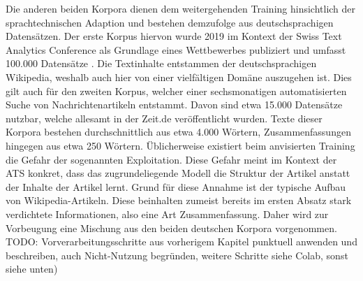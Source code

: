 Die anderen beiden Korpora dienen dem weitergehenden Training hinsichtlich der sprachtechnischen Adaption und bestehen demzufolge aus deutschsprachigen Datensätzen. Der erste Korpus hiervon wurde 2019 im Kontext der Swiss Text Analytics Conference als Grundlage eines Wettbewerbes publiziert und umfasst 100.000 Datensätze \cite{CIE19}. Die Textinhalte entstammen der deutschsprachigen Wikipedia, weshalb auch hier von einer vielfältigen Domäne auszugehen ist. Dies gilt auch für den zweiten Korpus, welcher einer sechsmonatigen automatisierten Suche von Nachrichtenartikeln entstammt. Davon sind etwa 15.000 Datensätze nutzbar, welche allesamt in der Zeit.de veröffentlicht wurden. Texte dieser Korpora bestehen durchschnittlich aus etwa 4.000 Wörtern, Zusammenfassungen hingegen aus etwa 250 Wörtern. Üblicherweise existiert beim anvisierten Training die Gefahr der sogenannten Exploitation. Diese Gefahr meint im Kontext der \ac{ATS} konkret, dass das zugrundeliegende Modell die Struktur der Artikel anstatt der Inhalte der Artikel lernt. Grund für diese Annahme ist der typische Aufbau von Wikipedia-Artikeln. Diese beinhalten zumeist bereits im ersten Absatz stark verdichtete Informationen, also eine Art Zusammenfassung. Daher wird zur Vorbeugung eine Mischung aus den beiden deutschen Korpora vorgenommen.\\


\noindent
TODO: Vorverarbeitungsschritte aus vorherigem Kapitel punktuell anwenden und beschreiben, auch Nicht-Nutzung begründen, weitere Schritte siehe Colab, sonst siehe unten)


